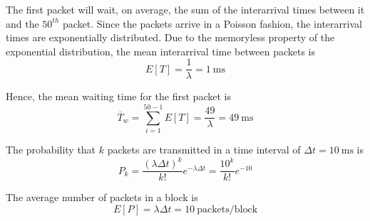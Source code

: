 The first packet will wait, on average, the sum of the interarrival times between
it and the $50^{th}$ packet. Since the packets arrive in a Poisson fashion, the
interarrival times are exponentially distributed. Due to the memoryless property
of the exponential distribution, the mean interarrival time between packets is
$$E[T] = \dfrac{1}{\lambda} = 1\ \text{ms}$$

Hence, the mean waiting time for the first packet is
$$\overline{T}_w = \sum_{i=1}^{50-1} E[T] = \dfrac{49}{\lambda} = 49\ \text{ms}$$

The probability that $k$ packets are transmitted in a time interval of
$\Delta t = 10\ \text{ms}$ is
$$P_k = \dfrac{(\lambda \Delta t)^k}{k!}e^{-\lambda \Delta t} = \dfrac{10^k}{k!}e^{-10}$$

The average number of packets in a block is
$$E[P] = \lambda \Delta t = 10\ \text{packets/block}$$
